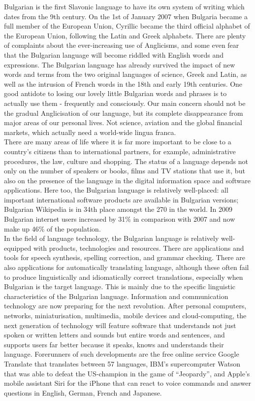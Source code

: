 \begin{multicols}{2}
Bulgarian is the first Slavonic language to have its own system of writing which dates from the 9th century. On the 1st of January 2007 when Bulgaria became a full member of the European Union, Cyrillic became the third official alphabet of the European Union, following the Latin and Greek alphabets. 
There are plenty of complaints about the ever-increasing use of Anglicisms, and some even fear that the Bulgarian language will become riddled with English words and expressions. The Bulgarian language has already survived the impact of new words and terms from the two original languages of science, Greek and Latin, as well as the intrusion of French words in the 18th and early 19th centuries. One good antidote to losing our lovely little Bulgarian words and phrases is to actually use them - frequently and consciously. Our main concern should not be the gradual Anglicisation of our language, but its complete disappearance from major areas of our personal lives. Not science, aviation and the global financial markets, which actually need a world-wide lingua franca.\\
There are many areas of life where it is far more important to be close to a country’s citizens than to international partners, for example, administrative procedures, the law, culture and shopping. The status of a language depends not only on the number of speakers or books, films and TV stations that use it, but also on the presence of the language in the digital information space and software applications. 
Here too, the Bulgarian language is relatively well-placed: all important international software products are available in Bulgarian versions; Bulgarian Wikipedia is in 34th place amongst the 270 in the world. In 2009 Bulgarian internet users increased by 31\% in comparison with 2007 and now make up 46\% of the population.\\
In the field of language technology, the Bulgarian language is relatively well-equipped with products, technologies and resources. There are applications and tools for speech synthesis, spelling correction, and grammar checking. There are also applications for automatically translating language, although these often fail to produce linguistically and idiomatically correct translations, especially when Bulgarian is the target language. This is mainly due to the specific linguistic characteristics of the Bulgarian language. 
Information and communication technology are now preparing for the next revolution. After personal computers, networks, miniaturisation, multimedia, mobile devices and cloud-computing, the next generation of technology will feature software that understands not just spoken or written letters and sounds but entire words and sentences, and supports users far better because it speaks, knows and understands their language. Forerunners of such developments are the free online service Google Translate that translates between 57 languages, IBM’s supercomputer Watson that was able to defeat the US-champion in the game of “Jeopardy”, and Apple’s mobile assistant Siri for the iPhone that can react to voice commands and answer questions in English, German, French and Japanese. 

\end{multicols}
